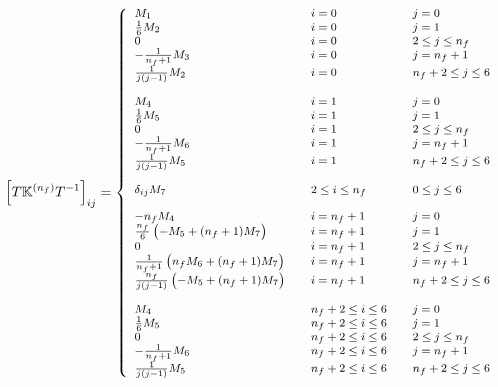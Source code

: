 \documentclass[10pt,a4paper]{article}
\begin{document}
\begin{equation}\label{eq:algorithmEv}
\footnotesize
\left[T\mathbb{K}^{(n_f)}T^{-1}\right]_{ij} =
\left\{
\begin{array}{lll}
M_1 & \quad i = 0 &\quad j = 0\\
\frac{1}{6}M_2 & \quad i = 0 &\quad  j = 1\\
0 & \quad i = 0 &\quad  2\leq j \leq n_f\\
-\frac{1}{n_f+1}M_3 & \quad i = 0 &\quad  j = n_f+1\\
\frac{1}{j(j-1)}M_2 & \quad i = 0 &\quad  n_f+ 2\leq j \leq 6\\
\\
M_4 & \quad i = 1&\quad  j=0\\
\frac16 M_5 & \quad i = 1 &\quad  j=1\\
0 & \quad i = 1 &\quad  2\leq j \leq n_f\\
-\frac{1}{n_f+1}M_6 & \quad i = 1 &\quad  j = n_f+1\\
\frac{1}{j(j-1)}M_5 & \quad i = 1 &\quad  n_f+
                                                            2\leq j
                                                            \leq 6\\
\\
\delta_{ij}M_7&\quad 2\leq i \leq n_f &\quad 0\leq j
                                                         \leq 6\\
\\
-n_fM_4 &\quad i = n_f+1 &\quad j =0\\
\frac{n_f}6\left(-M_5+(n_f+1)M_7\right) &\quad i = n_f+1 &\quad j =1\\
0 & \quad i = n_f+1 &\quad  2\leq j \leq n_f\\
\frac1{n_f+1}\left(n_f M_6+(n_f+1)M_7\right) &\quad i = n_f+1 &\quad j =n_f+1\\
\frac{n_f}{j(j-1)}\left( -M_5+(n_f+1)M_7\right) &\quad i = n_f+1
                  &\quad n_f+2 \leq j \leq 6\\
\\
M_4 & \quad n_f+2\leq i \leq 6 &\quad  j=0\\
\frac16 M_5 & \quad n_f+2\leq i \leq 6 &\quad  j=1\\
0 & \quad n_f+2\leq i \leq 6 &\quad  2\leq j \leq n_f\\
-\frac{1}{n_f+1}M_6 & \quad n_f+2\leq i \leq 6 &\quad  j = n_f+1\\
\frac{1}{j(j-1)}M_5 & \quad n_f+2\leq i \leq 6 &\quad  n_f+
                                                            2\leq j
                                                            \leq 6\\
\end{array}
\right.
\end{equation}
\end{document}

